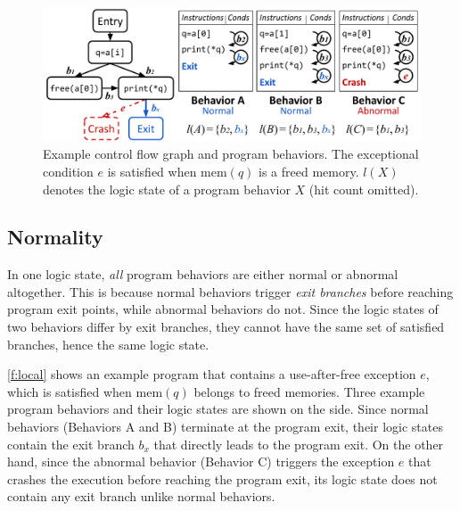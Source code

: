 \documentclass[letterpaper,twocolumn,10pt]{article}
\begin{document}
\begin{figure}[t]
  \centering
  \includegraphics[width=\columnwidth]{images/local.pdf}
  \caption{Example control flow graph and program behaviors. The exceptional
  condition $e$ is satisfied when $\mathrm{mem}(q)$ is a freed memory. $l(X)$
  denotes the logic state of a program behavior $X$ (hit count omitted).}
  \label{f:local}
\end{figure}

\subsection{Normality}
\label{s:prop:local}

In one logic state, \emph{all} program behaviors are either normal or abnormal
altogether. 
%
This is because normal behaviors trigger \emph{exit branches} before
reaching program exit points, while abnormal behaviors do not. Since the logic
states of two behaviors differ by exit branches, they cannot have the same set
of satisfied branches, hence the same logic state.

\autoref{f:local} shows an example program that contains a use-after-free
exception $e$, which is satisfied when $\mathrm{mem}(q)$ belongs to freed
memories. Three example program behaviors and their logic states are shown on
the side. Since normal behaviors (Behaviors A and B) terminate at the program
exit, their logic states contain the exit branch $b_x$ that directly leads to
the program exit. On the other hand, since the abnormal behavior (Behavior C)
triggers the exception $e$ that crashes the execution before reaching the
program exit, its logic state does not contain any exit branch unlike normal
behaviors.
\end{document}
